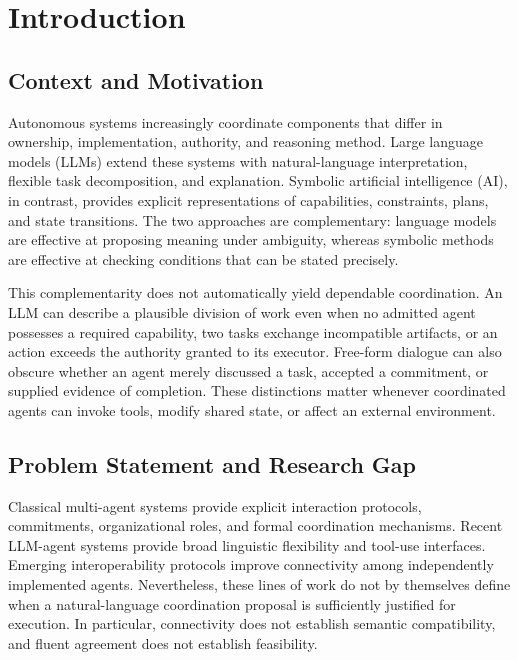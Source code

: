 \chapter{Introduction}
\label{chap:introduction}

\section{Context and Motivation}

Autonomous systems increasingly coordinate components that differ in ownership, implementation, authority, and reasoning method. Large language models (LLMs) extend these systems with natural-language interpretation, flexible task decomposition, and explanation. Symbolic artificial intelligence (AI), in contrast, provides explicit representations of capabilities, constraints, plans, and state transitions. The two approaches are complementary: language models are effective at proposing meaning under ambiguity, whereas symbolic methods are effective at checking conditions that can be stated precisely.

This complementarity does not automatically yield dependable coordination. An LLM can describe a plausible division of work even when no admitted agent possesses a required capability, two tasks exchange incompatible artifacts, or an action exceeds the authority granted to its executor. Free-form dialogue can also obscure whether an agent merely discussed a task, accepted a commitment, or supplied evidence of completion. These distinctions matter whenever coordinated agents can invoke tools, modify shared state, or affect an external environment.

\section{Problem Statement and Research Gap}

Classical multi-agent systems provide explicit interaction protocols, commitments, organizational roles, and formal coordination mechanisms. Recent LLM-agent systems provide broad linguistic flexibility and tool-use interfaces. Emerging interoperability protocols improve connectivity among independently implemented agents. Nevertheless, these lines of work do not by themselves define when a natural-language coordination proposal is sufficiently justified for execution. In particular, connectivity does not establish semantic compatibility, and fluent agreement does not establish feasibility.

